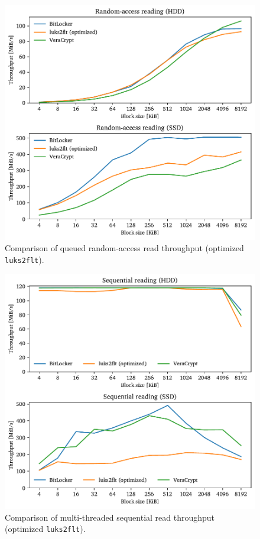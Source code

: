 \begin{figure}[htb!]
	\center
	\includegraphics[scale=1]{../fig/performance.hwexperiments.optrandqueue.pdf}
	\caption[
		Comparison of queued random-access read throughput (optimized \texttt{luks2flt})
	]{
		Comparison of queued random-access read throughput (optimized \texttt{luks2flt}). 
	}
	\label{fig:performance.hwexperiments.optrandqueue}
\end{figure}

\begin{figure}[htb!]
	\center
	\includegraphics[scale=1]{../fig/performance.hwexperiments.optseqthreads.pdf}
	\caption[
		Comparison of multi-threaded sequential read throughput (optimized \texttt{luks2flt})
	]{
		Comparison of multi-threaded sequential read throughput (optimized \texttt{luks2flt}). 
	}
	\label{fig:performance.hwexperiments.optseqthreads}
\end{figure}

